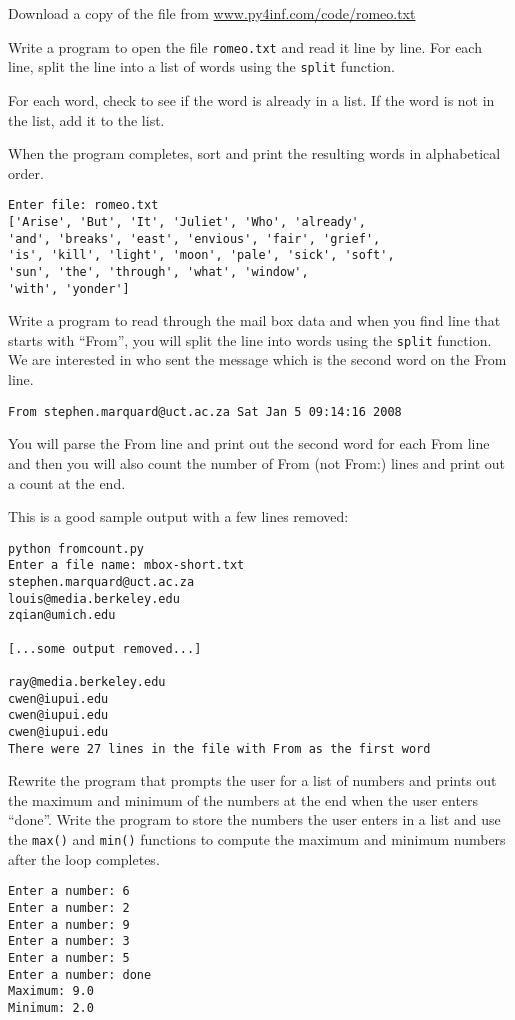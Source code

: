 \begin{ex}
Download a copy of the file from 
\url{www.py4inf.com/code/romeo.txt}

Write a program to open the file {\tt romeo.txt} and read it
line by line.  For each line, split the line into  a list of 
words using the {\tt split} function.

For each word, check to see if the word is already in a list.  
If the word is not in the list, add it to the list.  

When the program completes, sort and print the resulting words
in alphabetical order.

\begin{verbatim}
Enter file: romeo.txt
['Arise', 'But', 'It', 'Juliet', 'Who', 'already', 
'and', 'breaks', 'east', 'envious', 'fair', 'grief', 
'is', 'kill', 'light', 'moon', 'pale', 'sick', 'soft', 
'sun', 'the', 'through', 'what', 'window', 
'with', 'yonder']
\end{verbatim}
\end{ex}

\begin{ex}
Write a program to read through the mail box data and when you find 
line that starts with ``From'', you will split the line into 
words using the {\tt split} function. We are interested in 
who sent the message which is the second word on the From line.

{\tt From stephen.marquard@uct.ac.za Sat Jan  5 09:14:16 2008 }

You will parse the From line and print out the second word for 
each From line and then you will also count the number of 
From (not From:) lines and print out a count at the end.

This is a good sample output with a few lines removed:

\beforeverb
\begin{verbatim}
python fromcount.py 
Enter a file name: mbox-short.txt
stephen.marquard@uct.ac.za
louis@media.berkeley.edu
zqian@umich.edu

[...some output removed...]

ray@media.berkeley.edu
cwen@iupui.edu
cwen@iupui.edu
cwen@iupui.edu
There were 27 lines in the file with From as the first word
\end{verbatim}
\afterverb
%
\end{ex}

\begin{ex}
Rewrite the program that prompts the user for a list of 
numbers and prints out the maximum and minimum of the
numbers at the end when the user enters ``done''.  Write
the program to store the numbers the user enters in a list
and use the {\tt max()} and {\tt min()} functions to 
compute the maximum and minimum numbers after the 
loop completes.

\beforeverb
\begin{verbatim}
Enter a number: 6
Enter a number: 2
Enter a number: 9
Enter a number: 3
Enter a number: 5
Enter a number: done
Maximum: 9.0
Minimum: 2.0
\end{verbatim}
\afterverb
%

\end{ex}

